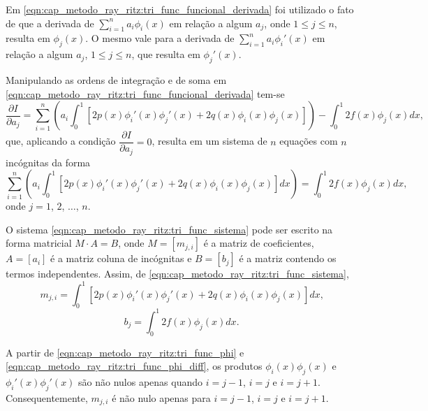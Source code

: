 \documentclass[
	12pt,				%
	openright,			%
    twoside,			%
	a4paper,			%
	english,			%
	french,				%
	spanish,			%
	brazil				%
	]{abntex2}
\numberwithin{lema}{chapter}
\numberwithin{teorema}{chapter}
\numberwithin{definicao}{chapter}
\numberwithin{exemplo}{chapter}
\numberwithin{figure}{chapter}
\begin{document}
Em \eqref{eqn:cap_metodo_ray_ritz:tri_func_funcional_derivada} foi utilizado o fato de que a derivada de $\displaystyle \sum_{i=1}^{n} a_i \phi_i(x)$ em relação a algum $a_j$, onde $1\leqslant j\leqslant n$, resulta em $\phi_j(x)$. O mesmo vale para a derivada de $\displaystyle \sum_{i=1}^{n} a_i \phi_i'(x)$ em relação a algum $a_j$, $1\leqslant j\leqslant n$, que resulta em $\phi_j'(x)$.

Manipulando as ordens de integração e de soma em \eqref{eqn:cap_metodo_ray_ritz:tri_func_funcional_derivada} tem-se
$$
	\frac{\partial I}{\partial a_j} = \sum_{i=1}^{n} \left (
		a_i \int_{0}^{1} \left [
			2p(x)\phi_i'(x)\phi_j'(x)
			+
			2q(x)\phi_i(x)\phi_j(x)
		\right ]
	\right )
	-
	\int_{0}^{1} 2f(x)\phi_j(x)dx
	\text{,}
$$
que, aplicando a condição $\dfrac{\partial I}{\partial a_j}=0$, resulta em um sistema de $n$ equações com $n$ incógnitas da forma
\begin{equation}
	\label{eqn:cap_metodo_ray_ritz:tri_func_sistema}
	\sum_{i=1}^{n} \left (
		a_i \int_{0}^{1} \left [
			2p(x)\phi_i'(x)\phi_j'(x)
			+
			2q(x)\phi_i(x)\phi_j(x)
		\right ] dx
	\right )
	=
	\int_{0}^{1} 2f(x)\phi_j(x)dx
	\text{,}
\end{equation}
onde $j=1$, $2$, $\dots$, $n$.

O sistema \eqref{eqn:cap_metodo_ray_ritz:tri_func_sistema} pode ser escrito na forma matricial $M\cdot A=B$, onde $M=[m_{j, i}]$ é a matriz de coeficientes, $A=[a_i]$ é a matriz coluna de incógnitas e $B=[b_j]$ é a matriz contendo os termos independentes. Assim, de \eqref{eqn:cap_metodo_ray_ritz:tri_func_sistema},
\begin{equation}
	\label{eqn:cap_metodo_ray_ritz:tri_func_mji}
	m_{j,i}=\int_{0}^{1} \left [
		2p(x)\phi_i'(x)\phi_j'(x)
		+
		2q(x)\phi_i(x)\phi_j(x)
	\right ]dx
	\text{,}
\end{equation}
\begin{equation}
	\label{eqn:cap_metodo_ray_ritz:tri_func_bj}
	b_j=\int_{0}^{1} 2f(x)\phi_j(x)dx
	\text{.}
\end{equation}

A partir de \eqref{eqn:cap_metodo_ray_ritz:tri_func_phi} e \eqref{eqn:cap_metodo_ray_ritz:tri_func_phi_diff}, os produtos $\phi_i(x)\phi_j(x)$ e $\phi_i'(x)\phi_j'(x)$ são não nulos apenas quando $i=j-1$, $i=j$ e $i=j+1$. Consequentemente, $m_{j,i}$ é não nulo apenas para $i=j-1$, $i=j$ e $i=j+1$.
\end{document}
